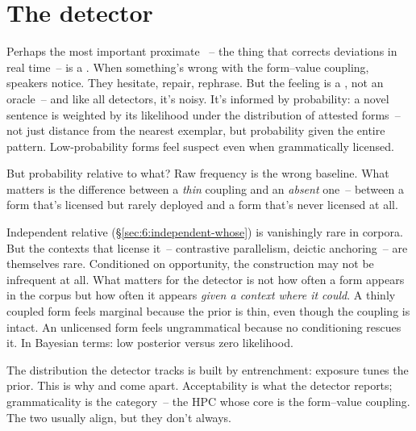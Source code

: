 \section{The detector}
\label{sec:15:detector}

Perhaps the most important proximate ~-- the thing that corrects deviations in real time~-- is a . When something's wrong with the form--value coupling, speakers notice. They hesitate, repair, rephrase. But the feeling is a , not an oracle~-- and like all detectors, it's noisy. It's informed by probability: a novel sentence is weighted by its likelihood under the distribution of attested forms~-- not just distance from the nearest exemplar, but probability given the entire pattern. Low-probability forms feel suspect even when grammatically licensed.

But probability relative to what? Raw frequency is the wrong baseline. What matters is the difference between a \emph{thin} coupling and an \emph{absent} one~-- between a form that's licensed but rarely deployed and a form that's never licensed at all.

Independent relative  (§\ref{sec:6:independent-whose}) is vanishingly rare in corpora. But the contexts that license it~-- contrastive parallelism, deictic anchoring~-- are themselves rare. Conditioned on opportunity, the construction may not be infrequent at all. What matters for the detector is not how often a form appears in the corpus but how often it appears \emph{given a context where it could}. A thinly coupled form feels marginal because the prior is thin, even though the coupling is intact. An unlicensed form feels ungrammatical because no conditioning rescues it. In Bayesian terms: low posterior versus zero likelihood.

The distribution the detector tracks is built by entrenchment: exposure tunes the prior. This is why  and  come apart. Acceptability is what the detector reports; grammaticality is the category~-- the HPC whose core is the form--value coupling. The two usually align, but they don't always.

